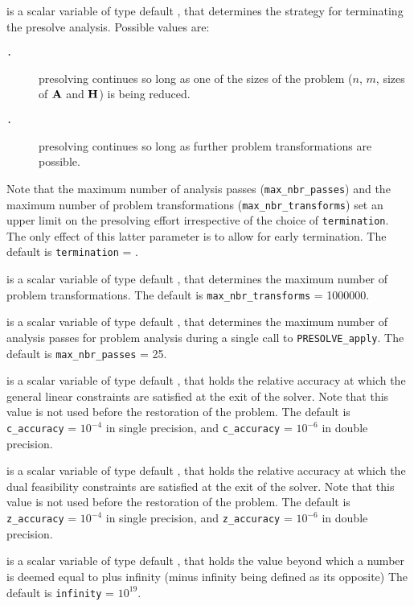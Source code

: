 \documentclass{galahad}
\newcommand{\packagename}{PRESOLVE}
\newcommand{\sym}{\tt\small}
\begin{document}
\begin{description}
 is a scalar variable of type default \integer, that
determines the strategy for terminating the presolve analysis.  
Possible values are:
\begin{description}
\item[\sym \galsymreducedsize.]  presolving continues so long as one of
            the sizes of the problem ($n$, $m$, sizes of ${\mathbf{A}}$ and ${\mathbf{H}}$) is
            being reduced.
\item[\sym \galsymfullpresolve.] presolving continues so long as further 
            problem transformations are possible.
\end{description}
Note that the maximum number of analysis passes ({\tt max\_nbr\_passes})  and
the maximum number of problem transformations ({\tt max\_nbr\_transforms})  
set an upper limit on the  presolving effort irrespective of the choice of
{\tt termination}. The only effect of this latter parameter is to allow for
early termination. 
The default is {\tt termination} = {\sym \galsymreducedsize}.

 is a scalar variable of type default \integer, that
determines the maximum number of problem transformations.
The default is {\tt max\_nbr\_transforms} = 1000000.

 is a scalar variable of type default \integer, that
determines the maximum number of analysis passes for problem analysis
during a single call to {\tt \packagename\_apply}.
The default is {\tt max\_nbr\_passes} = 25.

 is a scalar variable of type default \realdp, that holds the
relative accuracy at which the general linear constraints are satisfied at 
the exit of the solver. Note that this value is not used before the restoration
of the problem.
The default is {\tt c\_accuracy} = $10^{-4}$ in single precision, and
{\tt c\_accuracy} = $10^{-6}$ in double precision.

 is a scalar variable of type default \realdp, that holds the
relative accuracy at which the dual feasibility constraints are satisfied at
the exit of the solver. Note that this value is not used before the restoration
of the problem.
The default is {\tt z\_accuracy} = $10^{-4}$ in single precision, and
{\tt z\_accuracy} = $10^{-6}$ in double precision.

 is a scalar variable of type default \realdp, that holds the
value beyond which a number is deemed equal to plus infinity 
(minus infinity being defined as its opposite)
The default is {\tt infinity} = $10^{19}$.


\end{description}
\end{document}
